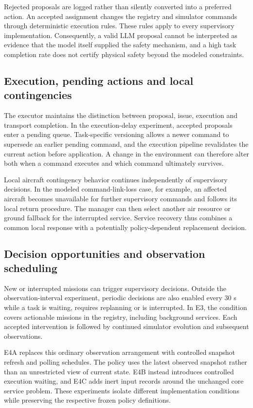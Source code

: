 \documentclass[]{interact}
\theoremstyle{plain}
\theoremstyle{definition}
\theoremstyle{remark}
\begin{document}
Rejected proposals are logged rather than silently converted into a preferred action. An accepted assignment changes the registry and simulator commands through deterministic execution rules. These rules apply to every supervisory implementation. Consequently, a valid LLM proposal cannot be interpreted as evidence that the model itself supplied the safety mechanism, and a high task completion rate does not certify physical safety beyond the modeled constraints.

\subsection{Execution, pending actions and local contingencies}

The executor maintains the distinction between proposal, issue, execution and transport completion. In the execution-delay experiment, accepted proposals enter a pending queue. Task-specific versioning allows a newer command to supersede an earlier pending command, and the execution pipeline revalidates the current action before application. A change in the environment can therefore alter both when a command executes and which command ultimately survives.

Local aircraft contingency behavior continues independently of supervisory decisions. In the modeled command-link-loss case, for example, an affected aircraft becomes unavailable for further supervisory commands and follows its local return procedure. The manager can then select another air resource or ground fallback for the interrupted service. Service recovery thus combines a common local response with a potentially policy-dependent replacement decision.

\subsection{Decision opportunities and observation scheduling}

New or interrupted missions can trigger supervisory decisions. Outside the observation-interval experiment, periodic decisions are also enabled every 30 s while a task is waiting, requires replanning or is interrupted. In E3, the condition covers actionable missions in the registry, including background services. Each accepted intervention is followed by continued simulator evolution and subsequent observations.

E4A replaces this ordinary observation arrangement with controlled snapshot refresh and polling schedules. The policy uses the latest observed snapshot rather than an unrestricted view of current state. E4B instead introduces controlled execution waiting, and E4C adds inert input records around the unchanged core service problem. These experiments isolate different implementation conditions while preserving the respective frozen policy definitions.
\end{document}
